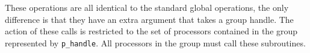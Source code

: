 These operations are all identical to the standard global operations,
the only difference is that they have an extra argument that takes
a group handle. The action of these calls is restricted to the set
of processors contained in the group represented by \texttt{p\_handle}.
All processors in the group must call these subroutines.
